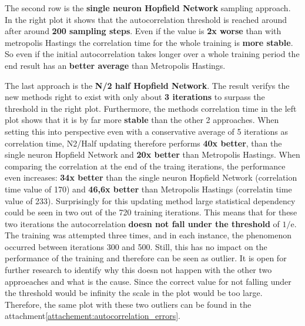 The second row is the \textbf{single neuron Hopfield Network} sampling approach. 
In the right plot it shows that the autocorrelation threshold is reached around after around \textbf{200 sampling steps}.
Even if the value is \textbf{2x worse} than with metropolis Hastings the correlation time for the whole training is \textbf{more stable}.
So even if the initial autocorrelation takes longer over a whole training period the end result has an \textbf{better average} than Metropolis Hastings.

The last approach is the \textbf{N/2 half Hopfield Network}. 
The result verifys the new methods right to exist with only about \textbf{3 iterations} to surpass the threshold in the right plot.
Furthermore, the methods correlation time in the left plot shows that it is by far more \textbf{stable} than the other 2 approaches.
When setting this into perspective even with a conservative average of 5 iterations as correlation time, N2/Half updating therefore
performs \textbf{40x better}, than the single neuron Hopfield Network and \textbf{20x better} than Metropolis Hastings.
When comparing the correlation at the end of the traing iterations, the performance even increases: \textbf{34x better} than the single neuron Hopfield Network (correlation time value of 170) and \textbf{46,6x better} than Metropolis Hastings (correlatin time value of 233).
Surprisingly for this updating method large statistical dependency could be seen in two out of the 720 training iterations.
This means that for these two iterations the autocorrelation \textbf{doesn not fall under the threshold} of \(1/\mathrm{e}\).
The training was attempted three times, and in each instance, the phenomenon occurred between iterations 300 and 500.
Still, this has no impact on the performance of the training and therefore can be seen as outlier.
It is open for further research to identify why this doesn not happen with the other two approeaches and what is the cause.
Since the correct value for not falling under the threshold would be infinity the scale in the plot would be too large. 
Therefore, the same plot with these two outliers can be found in the attachment\ref{attachement:autocorrelation_errors}.

